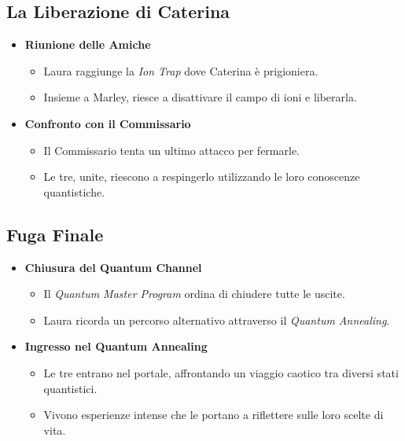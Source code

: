 \subsection*{La Liberazione di Caterina}

\begin{itemize}
    \item \textbf{Riunione delle Amiche}
    \begin{itemize}
        \item Laura raggiunge la \emph{Ion Trap} dove Caterina è prigioniera.
        \item Insieme a Marley, riesce a disattivare il campo di ioni e liberarla.
    \end{itemize}

    \item \textbf{Confronto con il Commissario}
    \begin{itemize}
        \item Il Commissario tenta un ultimo attacco per fermarle.
        \item Le tre, unite, riescono a respingerlo utilizzando le loro conoscenze quantistiche.
    \end{itemize}
\end{itemize}

\subsection*{Fuga Finale}

\begin{itemize}
    \item \textbf{Chiusura del Quantum Channel}
    \begin{itemize}
        \item Il \emph{Quantum Master Program} ordina di chiudere tutte le uscite.
        \item Laura ricorda un percorso alternativo attraverso il \emph{Quantum Annealing}.
    \end{itemize}

    \item \textbf{Ingresso nel Quantum Annealing}
    \begin{itemize}
        \item Le tre entrano nel portale, affrontando un viaggio caotico tra diversi stati quantistici.
        \item Vivono esperienze intense che le portano a riflettere sulle loro scelte di vita.
    \end{itemize}
\end{itemize}

